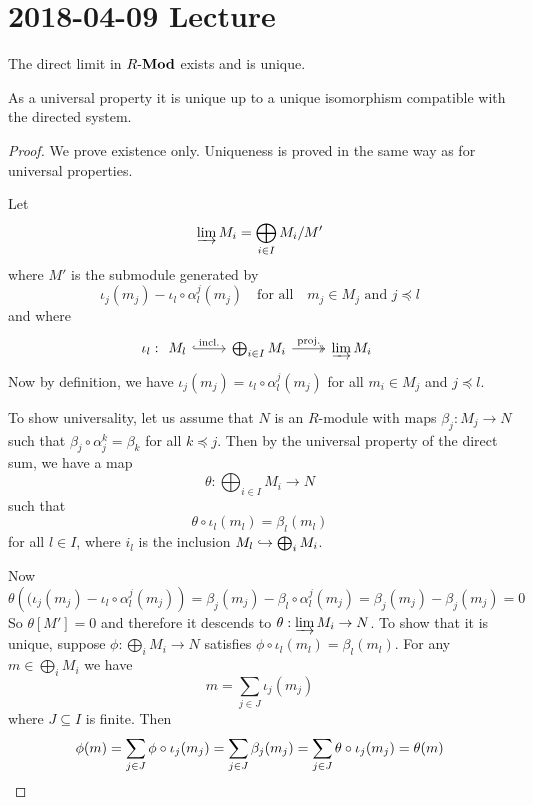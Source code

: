 \section{2018-04-09 Lecture}

\begin{prop}[1.14]
	The direct limit in $R\mbox{-}\mathbf{Mod}$ exists and is unique.
\end{prop}

\begin{rmk}
	As a universal property it is unique up to a unique isomorphism compatible with the directed system.
\end{rmk}

\begin{proof}
	We prove existence only.
	Uniqueness is proved in the same way as for universal properties.
	
	Let
	\[\varinjlim M_i = \bigoplus_{i \in I} M_i/M'\]
	where $M'$ is the submodule generated by
	\[\iota_j(m_j) - \iota_l\circ\alpha_l^j(m_j) \quad \text{for all} \quad m_j \in M_j \text{ and } j \preceq l\]
	and where
	\[\iota_l:
	\begin{tikzcd}
		M_l \ar[r, hookrightarrow, "\text{incl.}"] & \bigoplus_{i \in I} M_i \ar[r, twoheadrightarrow, "\text{proj.}"] & \varinjlim M_i
	\end{tikzcd}\]
	Now by definition, we have $\iota_j(m_j)=\iota_l\circ\alpha_l^j(m_j)$ for all $m_i \in M_j$ and $j \preceq l$.
	
	To show universality, let us assume that $N$ is an $R$-module with maps $\beta_j: M_j \to N$ such that $\beta_j \circ \alpha_j^k=\beta_k$ for all $k \preceq j$.
	Then by the universal property of the direct sum, we have a map
	\[\theta: \bigoplus_{i \in I} M_i \to N\]
	such that
	\[\theta \circ \iota_l(m_l) = \beta_l(m_l)\]
	for all $l \in I$, where $i_l$ is the inclusion $M_l \hookrightarrow \bigoplus_i M_i$.
	
	Now
	\[\theta\left((\iota_j(m_j)-\iota_l\circ\alpha_l^j(m_j)\right) = \beta_j(m_j)-\beta_l\circ\alpha_l^j(m_j) = \beta_j(m_j)-\beta_j(m_j) = 0\]
	So $\theta[M']=0$ and therefore it descends to $\theta: \varinjlim M_i \to N$.
	To show that it is unique, suppose $\phi: \bigoplus_i M_i \to N$ satisfies $\phi \circ \iota_l(m_l) = \beta_l(m_l)$.
	For any $m \in \bigoplus_i M_i$ we have
	\[m = \sum_{j \in J} \iota_j (m_j)\]
	where $J \subseteq I$ is finite.
	Then
	\[\phi(m) = \sum_{j \in J} \phi\circ\iota_j(m_j) = \sum_{j \in J} \beta_j(m_j) = \sum_{j \in J} \theta\circ\iota_j(m_j) = \theta(m) \qedhere\]
\end{proof}

